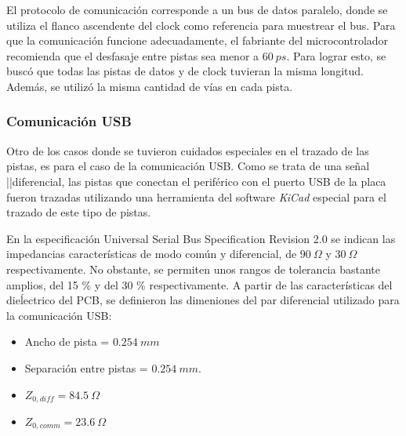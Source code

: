 

El protocolo de comunicación corresponde a un bus de datos paralelo, donde se utiliza el flanco ascendente del clock como referencia para muestrear el bus. Para que la comunicación funcione adecuadamente, el fabriante del microcontrolador recomienda que el desfasaje entre pistas sea menor a $60 \ ps$. Para lograr esto, se buscó que todas las pistas de datos y de clock tuvieran la misma longitud. Además, se utilizó la misma cantidad de vías en cada pista.




\subsubsection{Comunicación USB}


Otro de los casos donde se tuvieron cuidados especiales en el trazado de las pistas, es para el caso de la comunicación USB. Como se trata de una señal ||diferencial, las pistas que conectan el periférico con el puerto USB de la placa fueron trazadas utilizando una herramienta del software \textit{KiCad} especial para el trazado de este tipo de pistas.

En la especificación Universal Serial Bus Specification Revision 2.0 se indican las impedancias características de modo común y diferencial, de $90 \ \Omega$ y $30 \ \Omega$ respectivamente. No obstante, se permiten unos rangos de tolerancia bastante amplios, del 15 \% y del 30 \% respectivamente. A partir de las características del dieĺectrico del PCB, se definieron las dimeniones del par diferencial utilizado para la comunicación USB:

\begin{itemize}
    \item Ancho de pista = $0.254 \ mm$
    \item Separación entre pistas = $0.254 \ mm$.
    \item $Z_{0,diff} = 84.5 \ \Omega$
    \item $Z_{0,comm} = 23.6 \ \Omega$
\end{itemize} 

